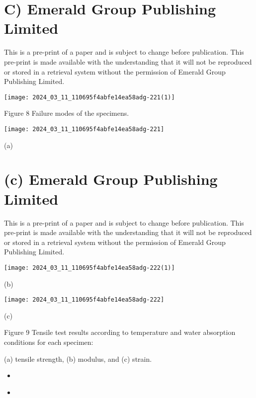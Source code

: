 \documentclass[10pt]{article}
\begin{document}
\section*{C) Emerald Group Publishing Limited}
This is a pre-print of a paper and is subject to change before publication. This pre-print is made available with the understanding that it will not be reproduced or stored in a retrieval system without the permission of Emerald Group Publishing Limited.

\begin{center}
\texttt{[image: 2024\_03\_11\_110695f4abfe14ea58adg-221(1)]}
\end{center}

Figure 8 Failure modes of the specimens.

\begin{center}
\texttt{[image: 2024\_03\_11\_110695f4abfe14ea58adg-221]}
\end{center}

(a)

\section*{(c) Emerald Group Publishing Limited}
This is a pre-print of a paper and is subject to change before publication. This pre-print is made available with the understanding that it will not be reproduced or stored in a retrieval system without the permission of Emerald Group Publishing Limited.

\begin{center}
\texttt{[image: 2024\_03\_11\_110695f4abfe14ea58adg-222(1)]}
\end{center}

(b)

\begin{center}
\texttt{[image: 2024\_03\_11\_110695f4abfe14ea58adg-222]}
\end{center}

(c)

Figure 9 Tensile test results according to temperature and water absorption conditions for each specimen:

(a) tensile strength, (b) modulus, and (c) strain.

\begin{itemize}
  \item 
\end{itemize}

\begin{itemize}
  \item 
\end{itemize}
\end{document}
